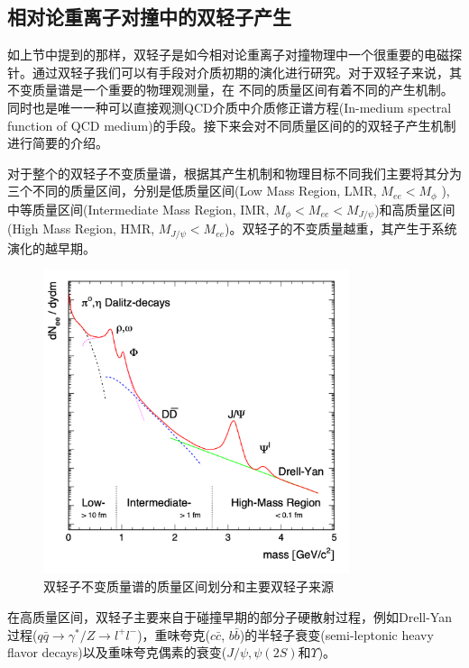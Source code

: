 \subsection{相对论重离子对撞中的双轻子产生}

如上节中提到的那样，双轻子是如今相对论重离子对撞物理中一个很重要的电磁探针。通过双轻子我们可以有手段对介质初期的演化进行研究。对于双轻子来说，其不变质量谱是一个重要的物理观测量，在 不同的质量区间有着不同的产生机制。同时也是唯一一种可以直接观测QCD介质中介质修正谱方程(In-medium spectral function of QCD medium)的手段。接下来会对不同质量区间的的双轻子产生机制进行简要的介绍。

对于整个的双轻子不变质量谱，根据其产生机制和物理目标不同我们主要将其分为三个不同的质量区间，分别是低质量区间(Low Mass Region, LMR, $M_{ee} < M_{\phi}$ ),中等质量区间(Intermediate Mass Region, IMR, $M_{\phi} < M_{ee} < M_{J/\psi}$)和高质量区间(High Mass Region, HMR, $M_{J/\psi} < M_{ee}$)。双轻子的不变质量越重，其产生于系统演化的越早期。

\begin{figure}[htb]
    \begin{center}
    \includegraphics[width=0.8\textwidth,clip]{figures/Chapter1/DileptonSpectra.png}
    \end{center}
    \caption[双轻子不变质量谱示意图]{双轻子不变质量谱的质量区间划分和主要双轻子来源}
    \label{fig:DileptonSpectra}
\end{figure}

在高质量区间，双轻子主要来自于碰撞早期的部分子硬散射过程，例如Drell-Yan过程($q\bar{q} \rightarrow \gamma^*/Z \rightarrow l^{+}l^{-}$)，重味夸克($c\bar{c}$, $b\bar{b}$)的半轻子衰变(semi-leptonic heavy flavor decays)以及重味夸克偶素的衰变($J/\psi, \psi(2S)$和$\Upsilon$)。

